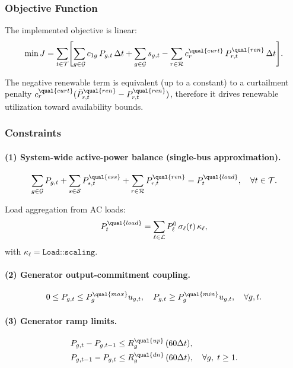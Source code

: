 \subsubsection{Objective Function}

The implemented objective is linear:
\begin{align}
\min J =
\sum_{t\in\mathcal{T}} \Biggl[
\sum_{g\in\mathcal{G}} c_{1g}\,P_{g,t}\,\Delta t
+ \sum_{g\in\mathcal{G}} s_{g,t}
- \sum_{r\in\mathcal{R}} c_r^{\qual{curt}}\,P^{\qual{ren}}_{r,t}\,\Delta t
\Biggr].
\label{eq:uc-obj-impl}
\end{align}

The negative renewable term is equivalent (up to a constant) to a curtailment
penalty
\(c_r^{\qual{curt}}(\bar P^{\qual{ren}}_{r,t}-P^{\qual{ren}}_{r,t})\),
therefore it drives renewable utilization toward availability bounds.

\subsubsection{Constraints}

\paragraph{(1) System-wide active-power balance (single-bus approximation).}
\begin{align}
\sum_{g\in\mathcal{G}} P_{g,t}
+ \sum_{s\in\mathcal{S}} P^{\qual{ess}}_{s,t}
+ \sum_{r\in\mathcal{R}} P^{\qual{ren}}_{r,t}
= P_t^{\qual{load}},
\quad \forall t\in\mathcal{T}.
\label{eq:uc-balance-impl}
\end{align}

Load aggregation from AC loads:
\begin{align}
P_t^{\qual{load}} = \sum_{\ell\in\mathcal{L}} P_\ell^0\,\sigma_\ell(t)\,\kappa_\ell,
\end{align}
with \(\kappa_\ell=\texttt{Load::scaling}\).

\paragraph{(2) Generator output-commitment coupling.}
\begin{align}
0 \le P_{g,t} \le P_g^{\qual{max}} u_{g,t},
\quad
P_{g,t} \ge P_g^{\qual{min}} u_{g,t},
\quad \forall g,t.
\label{eq:uc-p-u-coupling}
\end{align}

\paragraph{(3) Generator ramp limits.}
\begin{align}
P_{g,t}-P_{g,t-1} &\le R_g^{\qual{up}}\,(60\Delta t), \\
P_{g,t-1}-P_{g,t} &\le R_g^{\qual{dn}}\,(60\Delta t),
\quad \forall g,\; t\ge 1.
\label{eq:uc-ramp-impl}
\end{align}

